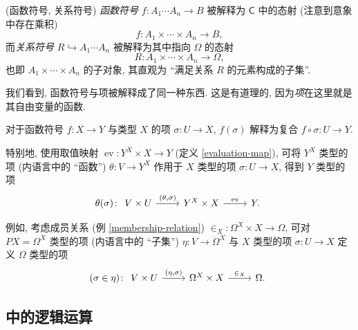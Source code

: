 \begin{definition}
	{(函数符号, 关系符号)}
	\emph{函数符号} $f\colon A_1\cdots A_n \to B$ 被解释为 $\mathsf C$ 中的态射 (注意到意象中存在乘积)
	$$f\colon A_1\times\cdots\times A_n\to B,$$
	而\emph{关系符号} $R\hookrightarrow A_1\cdots A_n$ 被解释为其中指向 $\Omega$ 的态射
	$$
	R\colon A_1\times\cdots\times A_n \to \Omega,
	$$
	也即 $A_1\times\cdots\times A_n$ 的子对象, 其直观为 ``满足关系 $R$ 的元素构成的子集''.
	
	我们看到, 函数符号与项被解释成了同一种东西. 这是有道理的, 因为\emph{项}在这里就是其自由变量的函数.
	
	对于函数符号 $f\colon X \to Y$ 与类型 $X$ 的项 $\sigma\colon U \to X$, $f(\sigma)$ 解释为复合 $f\circ\sigma \colon U \to Y$.
\end{definition}

特别地, 使用取值映射 $\operatorname{ev}\colon Y^X\times X\to Y$ (定义 \ref{evaluation-map}),
可将 $Y^X$ 类型的项 (内语言中的 ``函数'') $\theta\colon V\to Y^X$
作用于 $X$ 类型的项 $\sigma \colon U \to X$,
得到 $Y$ 类型的项
\[\theta(\sigma)\colon
\begin{tikzcd}[ampersand replacement=\&]
	{V\times U} \& {Y^X\times X} \& Y.
	\arrow["{(\theta,\sigma)}", from=1-1, to=1-2]
	\arrow["{\operatorname{ev}}", from=1-2, to=1-3]
\end{tikzcd}\]

例如, 考虑成员关系 (例 \ref{membership-relation}) ${\in_X} \colon \Omega^X\times X \to \Omega$,
可对 $PX=\Omega^X$ 类型的项 (内语言中的 ``子集'') $\eta\colon V \to \Omega^X$ 与 $X$ 类型的项 $\sigma\colon U\to X$ 定义 $\Omega$ 类型的项
\[
(\sigma \in \eta) \colon 
\begin{tikzcd}[ampersand replacement=\&]
	{V\times U} \& {\Omega^X\times X} \& \Omega.
	\arrow["{(\eta,\sigma)}", from=1-1, to=1-2]
	\arrow["{\in_X}", from=1-2, to=1-3]
\end{tikzcd}\]



\subsection{\topos{}中的逻辑运算}

